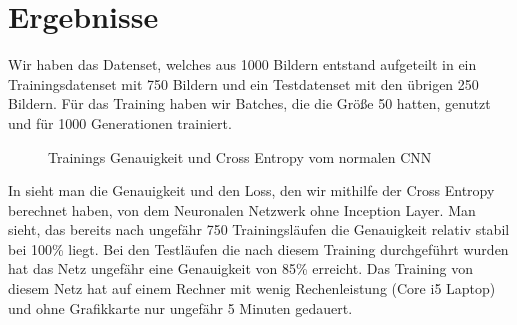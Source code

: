 \documentclass[runningheads,a4paper]{llncs}[2015/06/24]
\begin{document}
\section{Ergebnisse}\label{sec:result}
Wir haben das Datenset, welches aus 1000 Bildern entstand aufgeteilt in ein Trainingsdatenset mit 750 Bildern und ein Testdatenset mit den übrigen 250 Bildern. Für das Training haben wir Batches, die die  Größe 50 hatten, genutzt und für 1000 Generationen trainiert. \\

\begin{figure}
	\caption{Trainings Genauigkeit und Cross Entropy vom normalen CNN}
	\label{fig:conv_result_graph}
\end{figure}
In  sieht man die Genauigkeit und den Loss, den wir mithilfe der Cross Entropy berechnet haben, von dem Neuronalen Netzwerk ohne Inception Layer. Man sieht, das bereits nach ungefähr 750 Trainingsläufen die Genauigkeit relativ stabil bei 100\% liegt. Bei den Testläufen die nach diesem Training durchgeführt wurden hat das Netz ungefähr eine Genauigkeit von 85\% erreicht. Das Training von diesem Netz hat auf einem Rechner mit wenig Rechenleistung (Core i5 Laptop) und ohne Grafikkarte nur ungefähr 5 Minuten gedauert.\\
\end{document}
